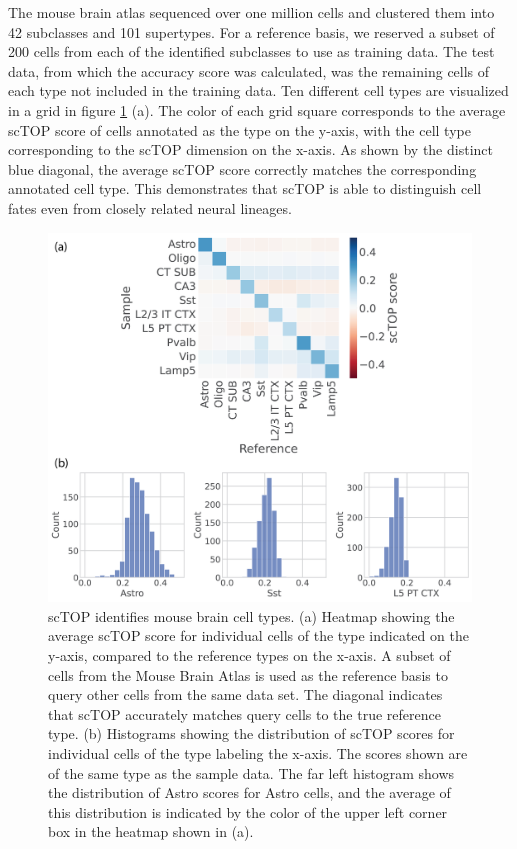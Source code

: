 \documentclass[aps,superscriptaddress, notitlepage,longbibliography]{revtex4-1}
\begin{document}
The mouse brain atlas \cite{yao_taxonomy_2021} sequenced over one million cells and clustered them into 42 subclasses and 101 supertypes. For a reference basis, we reserved a subset of 200 cells from each of the identified subclasses to use as training data. The test data, from which the accuracy score was calculated, was the remaining cells of each type not included in the training data. Ten different cell types are visualized in a grid in figure \ref{mouse_brain} (a). The color of each grid square corresponds to the average scTOP score of cells annotated as the type on the y-axis, with the cell type corresponding to the scTOP dimension on the x-axis. As shown by the distinct blue diagonal, the average scTOP score correctly matches the corresponding annotated cell type. This demonstrates that scTOP is able to distinguish cell fates even from closely related neural lineages.

\begin{figure}
	\centering
    \includegraphics[scale=0.75]{figs/mouse brain.png}
	\caption{scTOP identifies mouse brain cell types. (a) Heatmap showing the average scTOP score for individual cells of the type indicated on the y-axis, compared to the reference types on the x-axis. A subset of cells from the Mouse Brain Atlas is used as the reference basis to query other cells from the same data set. The diagonal indicates that scTOP accurately matches query cells to the true reference type. (b) Histograms showing the distribution of scTOP scores for individual cells of the type labeling the x-axis. The scores shown are of the same type as the sample data. The far left histogram shows the distribution of Astro scores for Astro cells, and the average of this distribution is indicated by the color of the upper left corner box in the heatmap shown in (a).}
	\label{mouse_brain}
\end{figure}
\end{document}
